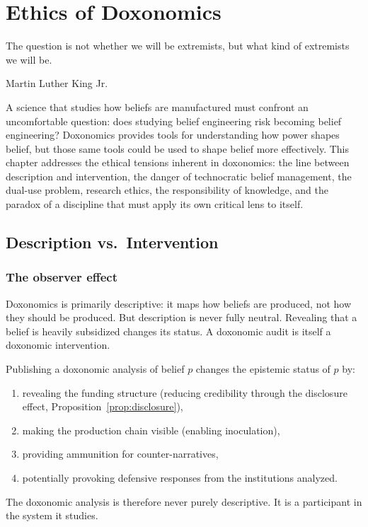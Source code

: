 \chapter{Ethics of Doxonomics}
\label{ch:ethics}

\epigraph{The question is not whether we will be extremists, but what kind of extremists we will be.}{Martin Luther King Jr.}

\noindent
A science that studies how beliefs are manufactured must confront an uncomfortable question: does studying belief engineering risk becoming belief engineering?
Doxonomics provides tools for understanding how power shapes belief, but those same tools could be used to shape belief more effectively.
This chapter addresses the ethical tensions inherent in doxonomics: the line between description and intervention, the danger of technocratic belief management, the dual-use problem, research ethics, the responsibility of knowledge, and the paradox of a discipline that must apply its own critical lens to itself.

\section{Description vs.\ Intervention}
\label{sec:ch34-description}

\subsection{The observer effect}

Doxonomics is primarily descriptive: it maps how beliefs are produced, not how they should be produced.
But description is never fully neutral.
Revealing that a belief is heavily subsidized changes its status.
A doxonomic audit is itself a doxonomic intervention.

\begin{proposition}
\label{prop:observer-effect}
Publishing a doxonomic analysis of belief $p$ changes the epistemic status of $p$ by:
\begin{enumerate}[nosep]
  \item revealing the funding structure (reducing credibility through the disclosure effect, Proposition~\ref{prop:disclosure}),
  \item making the production chain visible (enabling inoculation),
  \item providing ammunition for counter-narratives,
  \item potentially provoking defensive responses from the institutions analyzed.
\end{enumerate}
The doxonomic analysis is therefore never purely descriptive.
It is a participant in the system it studies.
\end{proposition}

